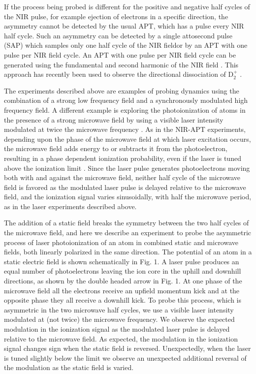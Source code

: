 \documentclass[aps,pra,preprint,groupedaddress]{revtex4-1}
\begin{document}
If the process being probed is different for the positive and negative half cycles of the NIR pulse, for example ejection of electrons in a specific direction, the asymmetry cannot be detected by the usual APT, which has a pulse every NIR half cycle. Such an asymmetry can be detected by a single attosecond pulse (SAP) which samples only one half cycle of the NIR fieldor by an APT with one pulse per NIR field cycle. An APT with one pulse per NIR field cycle can be generated using the fundamental and second harmonic of the NIR field \cite{Mauritsson}. This approach has recently been used to observe the directional dissociation of D$_2^+$ \cite{Singh}.

The experiments described above are examples of probing dynamics using the combination of a strong low frequency field and a synchronously modulated high frequency field. A different example is exploring the photoionization of atoms in the presence of a strong microwave field by using a visible laser intensity modulated at twice the microwave frequency \cite{Carrat}. As in the NIR-APT experiments, depending upon the phase of the microwave field at which laser excitation occurs, the microwave field adds energy to or subtracts it from the photoelectron, resulting in a phase dependent ionization probability, even if the laser is tuned above the ionization limit \cite{Shuman}. Since the laser pulse generates photoelectrons moving both with and against the microwave field, neither half cycle of the microwave field is favored as the modulated laser pulse is delayed relative to the microwave field, and the ionization signal varies sinusoidally, with half the microwave period, as in the laser experiments described above.

The addition of a static field breaks the symmetry between the two half cycles of the microwave field, and here we describe an experiment to probe the asymmetric process of laser photoionization of an atom in combined static and microwave fields, both linearly polarized in the same direction. The potential of an atom in a static electric field is shown schematically in Fig. 1. A laser pulse produces an equal number of photoelectrons leaving the ion core in the uphill and downhill directions, as shown by the double headed arrow in Fig. 1. At one phase of the microwave field all the electrons receive an upfield momentum kick and at the opposite phase they all receive a downhill kick. To probe this process, which is asymmetric in the two microwave half cycles, we use a visible laser intensity modulated at (not twice) the microwave frequency. We observe the expected modulation in the ionization signal as the modulated laser pulse is delayed relative to the microwave field. As expected, the modulation in the ionization signal changes sign when the static field is reversed. Unexpectedly, when the laser is tuned slightly below the limit we observe an unexpected additional reversal of the modulation as the static field is varied.
\end{document}
